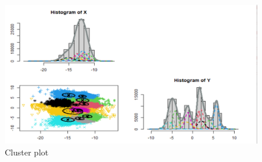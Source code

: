 \documentclass[11pt,a4paper,]{article}
\begin{document}
\begin{figure}

{\centering \includegraphics[width=1\linewidth]{image/11clust} 

}

\caption{Cluster plot}\label{fig:clustone}
\end{figure}
\end{document}
